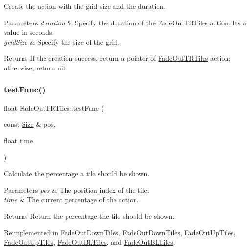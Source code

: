 Create the action with the grid size and the duration. 


\begin{DoxyParams}{Parameters}
{\em duration} & Specify the duration of the \hyperlink{classFadeOutTRTiles}{Fade\+Out\+T\+R\+Tiles} action. It\textquotesingle{}s a value in seconds. \\
\hline
{\em grid\+Size} & Specify the size of the grid. \\
\hline
\end{DoxyParams}
\begin{DoxyReturn}{Returns}
If the creation success, return a pointer of \hyperlink{classFadeOutTRTiles}{Fade\+Out\+T\+R\+Tiles} action; otherwise, return nil. 
\end{DoxyReturn}
\mbox{\label{classFadeOutTRTiles_aed87971151a43d41b598a8c65f0e7d8f}} 
\subsubsection{\texorpdfstring{test\+Func()}{testFunc()}\hspace{0.1cm}{\footnotesize\ttfamily [1/2]}}
{\footnotesize\ttfamily float Fade\+Out\+T\+R\+Tiles\+::test\+Func (\begin{DoxyParamCaption}\item[{const \hyperlink{classSize}{Size} \&}]{pos,  }\item[{float}]{time }\end{DoxyParamCaption})\hspace{0.3cm}{\ttfamily [virtual]}}



Calculate the percentage a tile should be shown. 


\begin{DoxyParams}{Parameters}
{\em pos} & The position index of the tile. \\
\hline
{\em time} & The current percentage of the action. \\
\hline
\end{DoxyParams}
\begin{DoxyReturn}{Returns}
Return the percentage the tile should be shown. 
\end{DoxyReturn}


Reimplemented in \hyperlink{classFadeOutDownTiles_a650db33238577e696174930b01d06045}{Fade\+Out\+Down\+Tiles}, \hyperlink{classFadeOutDownTiles_a6fa98b6fda5e72b41542f4209866c3f3}{Fade\+Out\+Down\+Tiles}, \hyperlink{classFadeOutUpTiles_ac01a15f89dca9a3a4c1585031abf6d2c}{Fade\+Out\+Up\+Tiles}, \hyperlink{classFadeOutUpTiles_a8a0a0c36e5c02a518dc649b2ec7d8864}{Fade\+Out\+Up\+Tiles}, \hyperlink{classFadeOutBLTiles_a17aa884f96bbdc18e8500bfb5bf68257}{Fade\+Out\+B\+L\+Tiles}, and \hyperlink{classFadeOutBLTiles_a00586757931bcc6166dc5052b0ef2633}{Fade\+Out\+B\+L\+Tiles}.

